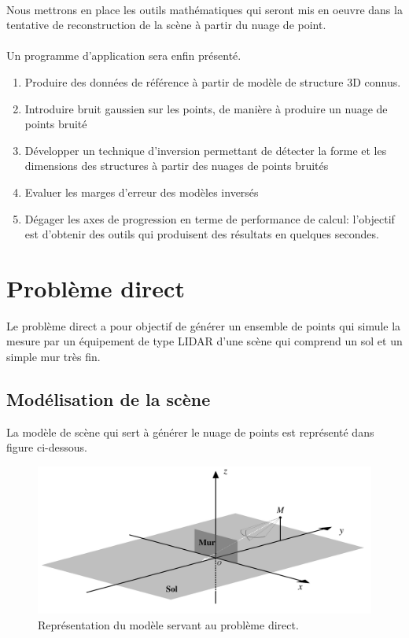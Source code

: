 \documentclass[12pt,a4paper]{report}
\begin{document}
\paragraph{} Nous mettrons en place les outils mathématiques qui seront mis en oeuvre dans la tentative de reconstruction de la scène à partir du nuage de point. 

\paragraph{} Un programme d'application sera enfin présenté.


\begin{enumerate}
\item
Produire des données de référence à partir de modèle de structure 3D connus.
\item
Introduire bruit gaussien sur les points, de manière à produire un nuage de points bruité
\item
Développer un technique d'inversion permettant de détecter la forme
et les dimensions des structures à partir des nuages de points
bruités
\item
Evaluer les marges d'erreur des modèles inversés
\item
Dégager les axes de progression en terme de performance de calcul:
l'objectif est d'obtenir des outils qui produisent des résultats en
quelques secondes.
\end{enumerate}


\section{Problème direct}
Le problème direct a pour objectif de générer un ensemble de points qui simule la mesure par un équipement de type LIDAR d'une scène qui comprend un sol et un simple mur très fin.

\subsection{Modélisation de la scène}

La modèle de scène qui sert à générer le nuage de points  est représenté dans figure ci-dessous.



\begin{figure}[H]
	\centering
	\includegraphics[width=0.8\linewidth]{img/AppliNumScene}
	\caption{Représentation du modèle servant au problème direct.}
	\label{fig:applinumscene}
\end{figure}
\end{document}

